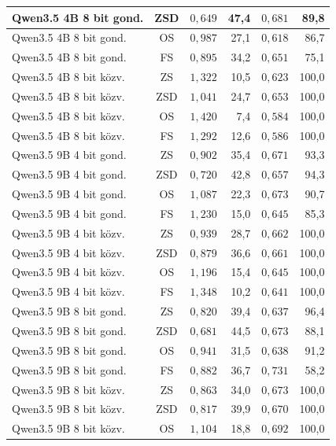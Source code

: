 \documentclass[
]{elteikthesis}[2024/04/26]
\begin{document}
\begin{longtable}{ | l | c | r | r | r | r | }
	\hline
	Qwen3.5 4B 8 bit gond. & ZSD & $0{,}649$ & 47,4 & $0{,}681$ & 89,8 \\
	\hline
	Qwen3.5 4B 8 bit gond. & OS & $0{,}987$ & 27,1 & $0{,}618$ & 86,7 \\
	\hline
	Qwen3.5 4B 8 bit gond. & FS & $0{,}895$ & 34,2 & $0{,}651$ & 75,1 \\
	\hline
	Qwen3.5 4B 8 bit közv. & ZS & $1{,}322$ & 10,5 & $0{,}623$ & 100,0 \\
	\hline
	Qwen3.5 4B 8 bit közv. & ZSD & $1{,}041$ & 24,7 & $0{,}653$ & 100,0 \\
	\hline
	Qwen3.5 4B 8 bit közv. & OS & $1{,}420$ & 7,4 & $0{,}584$ & 100,0 \\
	\hline
	Qwen3.5 4B 8 bit közv. & FS & $1{,}292$ & 12,6 & $0{,}586$ & 100,0 \\
	\hline
	Qwen3.5 9B 4 bit gond. & ZS & $0{,}902$ & 35,4 & $0{,}671$ & 93,3 \\
	\hline
	Qwen3.5 9B 4 bit gond. & ZSD & $0{,}720$ & 42,8 & $0{,}657$ & 94,3 \\
	\hline
	Qwen3.5 9B 4 bit gond. & OS & $1{,}087$ & 22,3 & $0{,}673$ & 90,7 \\
	\hline
	Qwen3.5 9B 4 bit gond. & FS & $1{,}230$ & 15,0 & $0{,}645$ & 85,3 \\
	\hline
	Qwen3.5 9B 4 bit közv. & ZS & $0{,}939$ & 28,7 & $0{,}662$ & 100,0 \\
	\hline
	Qwen3.5 9B 4 bit közv. & ZSD & $0{,}879$ & 36,6 & $0{,}661$ & 100,0 \\
	\hline
	Qwen3.5 9B 4 bit közv. & OS & $1{,}196$ & 15,4 & $0{,}645$ & 100,0 \\
	\hline
	Qwen3.5 9B 4 bit közv. & FS & $1{,}348$ & 10,2 & $0{,}641$ & 100,0 \\
	\hline
	Qwen3.5 9B 8 bit gond. & ZS & $0{,}820$ & 39,4 & $0{,}637$ & 96,4 \\
	\hline
	Qwen3.5 9B 8 bit gond. & ZSD & $0{,}681$ & 44,5 & $0{,}673$ & 88,1 \\
	\hline
	Qwen3.5 9B 8 bit gond. & OS & $0{,}941$ & 31,5 & $0{,}638$ & 91,2 \\
	\hline
	Qwen3.5 9B 8 bit gond. & FS & $0{,}882$ & 36,7 & $0{,}731$ & 58,2 \\
	\hline
	Qwen3.5 9B 8 bit közv. & ZS & $0{,}863$ & 34,0 & $0{,}673$ & 100,0 \\
	\hline
	Qwen3.5 9B 8 bit közv. & ZSD & $0{,}817$ & 39,9 & $0{,}670$ & 100,0 \\
	\hline
	Qwen3.5 9B 8 bit közv. & OS & $1{,}104$ & 18,8 & $0{,}692$ & 100,0 \\

\end{longtable}
\end{document}

